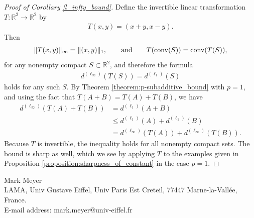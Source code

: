 \documentclass[11pt]{article}
\begin{document}
\begin{proof}[Proof of Corollary \ref{l_infty_bound}]
    Define the invertible linear transformation $T:\mathbb{R}^2\rightarrow\mathbb{R}^2$ by
    \begin{align*}
        T(x,y)=(x+y,x-y).
    \end{align*}
    Then
    \begin{align*}
        \|T(x,y)\|_{\infty}=\|(x,y)\|_1,\qquad \textup{and}\qquad T(\textup{conv}(S))=\textup{conv}(T(S)),
    \end{align*}  
    for any nonempty compact $S\subset\mathbb{R}^2$, and therefore the formula
    \begin{align*}
        d^{(\ell_{\infty})}(T(S))=d^{(\ell_1)}(S)
    \end{align*}
    holds for any such $S$. By Theorem \ref{theorem:p-subadditive_bound} with $p=1$, and using the fact that $T(A+B)=T(A)+T(B)$, we have
    \begin{align*}
        d^{(\ell_\infty)}(T(A)+T(B))&=d^{(\ell_1)}(A+B)\\
        &\leq d^{(\ell_1)}(A)+d^{(\ell_1)}(B)\\
        &=d^{(\ell_{\infty})}(T(A))+d^{(\ell_\infty)}(T(B)).
    \end{align*}
    Because $T$ is invertible, the inequality holds for all nonempty compact sets. The bound is sharp as well, which we see by applying $T$ to the examples given in Proposition \ref{proposition:sharpness_of_constant} in the case $p=1$.
    
\end{proof}

\newpage



\bigskip
\noindent Mark Meyer
\\
LAMA, Univ Gustave Eiffel, Univ Paris Est Creteil, 77447 Marne-la-Vall\'ee, France.
\\
E-mail address: mark.meyer@univ-eiffel.fr
\vspace{2mm}
\\
\end{document}
